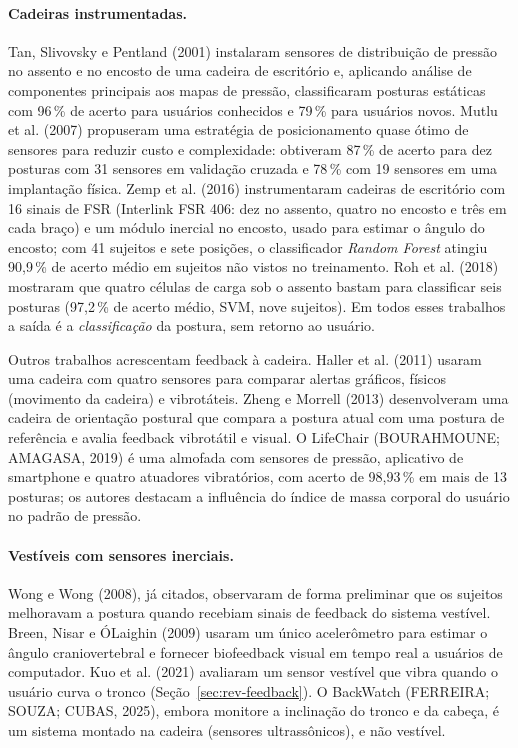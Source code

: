 \paragraph{Cadeiras instrumentadas.} Tan, Slivovsky e Pentland (2001) instalaram
sensores de distribuição de pressão no assento e no encosto de uma cadeira de
escritório e, aplicando análise de componentes principais aos mapas de pressão,
classificaram posturas estáticas com 96\,\% de acerto para usuários conhecidos e
79\,\% para usuários novos. Mutlu et al. (2007) propuseram uma estratégia de
posicionamento quase ótimo de sensores para reduzir custo e complexidade: obtiveram
87\,\% de acerto para dez posturas com 31 sensores em validação cruzada e 78\,\%
com 19 sensores em uma implantação física. Zemp et al. (2016) instrumentaram
cadeiras de escritório com 16 sinais de FSR (Interlink FSR 406: dez no assento,
quatro no encosto e três em cada braço) e um módulo inercial no encosto, usado para
estimar o ângulo do encosto; com 41 sujeitos e sete posições, o classificador
\emph{Random Forest} atingiu 90{,}9\,\% de acerto médio em sujeitos não vistos no
treinamento. Roh et al. (2018) mostraram que quatro células de carga sob o assento
bastam para classificar seis posturas (97{,}2\,\% de acerto médio, SVM, nove
sujeitos). Em todos esses trabalhos a saída é a \emph{classificação} da postura,
sem retorno ao usuário.

Outros trabalhos acrescentam feedback à cadeira. Haller et al. (2011) usaram uma
cadeira com quatro sensores para comparar alertas gráficos, físicos (movimento da
cadeira) e vibrotáteis. Zheng e Morrell (2013) desenvolveram uma cadeira de
orientação postural que compara a postura atual com uma postura de referência e
avalia feedback vibrotátil e visual. O LifeChair (BOURAHMOUNE; AMAGASA, 2019) é uma
almofada com sensores de pressão, aplicativo de smartphone e quatro atuadores
vibratórios, com acerto de 98{,}93\,\% em mais de 13 posturas; os autores destacam a
influência do índice de massa corporal do usuário no padrão de pressão.

\paragraph{Vestíveis com sensores inerciais.} Wong e Wong (2008), já citados,
observaram de forma preliminar que os sujeitos melhoravam a postura quando
recebiam sinais de feedback do sistema vestível. Breen, Nisar e ÓLaighin (2009)
usaram um único acelerômetro para estimar o ângulo craniovertebral e fornecer
biofeedback visual em tempo real a usuários de computador. Kuo et al. (2021)
avaliaram um sensor vestível que vibra quando o usuário curva o tronco
(Seção~\ref{sec:rev-feedback}). O BackWatch (FERREIRA; SOUZA; CUBAS, 2025), embora
monitore a inclinação do tronco e da cabeça, é um sistema montado na cadeira
(sensores ultrassônicos), e não vestível.

